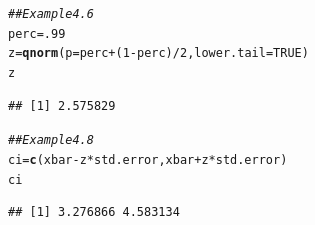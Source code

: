 \documentclass{report}\usepackage[]{graphicx}\usepackage[]{color}
\makeatletter
\newcommand{\hlnum}[1]{\textcolor[rgb]{0.686,0.059,0.569}{#1}}%
\newcommand{\hlcom}[1]{\textcolor[rgb]{0.678,0.584,0.686}{\textit{#1}}}%
\newcommand{\hlopt}[1]{\textcolor[rgb]{0,0,0}{#1}}%
\newcommand{\hlstd}[1]{\textcolor[rgb]{0.345,0.345,0.345}{#1}}%
\newcommand{\hlkwb}[1]{\textcolor[rgb]{0.69,0.353,0.396}{#1}}%
\newcommand{\hlkwc}[1]{\textcolor[rgb]{0.333,0.667,0.333}{#1}}%
\newcommand{\hlkwd}[1]{\textcolor[rgb]{0.737,0.353,0.396}{\textbf{#1}}}%
\newenvironment{kframe}{%
 \def\at@end@of@kframe{}%
 \ifinner\ifhmode%
  \def\at@end@of@kframe{\end{minipage}}%
  \begin{minipage}{\columnwidth}%
 \fi\fi%
 \def\FrameCommand##1{\hskip\@totalleftmargin \hskip-\fboxsep
 \colorbox{shadecolor}{##1}\hskip-\fboxsep
     \hskip-\linewidth \hskip-\@totalleftmargin \hskip\columnwidth}%
 \MakeFramed {\advance\hsize-\width
   \@totalleftmargin\z@ \linewidth\hsize
   \@setminipage}}%
 {\par\unskip\endMakeFramed%
 \at@end@of@kframe}
\newenvironment{knitrout}{}{} %
\makeatother
\begin{document}
\begin{knitrout}
\color{fgcolor}\begin{kframe}
\begin{alltt}
\hlcom{## Example 4.6 }
\hlstd{perc} \hlkwb{=} \hlnum{.99}
\hlstd{z} \hlkwb{=} \hlkwd{qnorm}\hlstd{(}\hlkwc{p} \hlstd{= perc} \hlopt{+} \hlstd{(}\hlnum{1}\hlopt{-}\hlstd{perc)}\hlopt{/}\hlnum{2}\hlstd{,} \hlkwc{lower.tail} \hlstd{=} \hlnum{TRUE}\hlstd{)}
\hlstd{z}
\end{alltt}
\begin{verbatim}
## [1] 2.575829
\end{verbatim}
\end{kframe}
\end{knitrout}

\begin{knitrout}
\color{fgcolor}\begin{kframe}
\begin{alltt}
\hlcom{## Example 4.8 }
\hlstd{ci} \hlkwb{=} \hlkwd{c}\hlstd{(xbar} \hlopt{-} \hlstd{z}\hlopt{*}\hlstd{std.error, xbar} \hlopt{+} \hlstd{z}\hlopt{*}\hlstd{std.error)}
\hlstd{ci}
\end{alltt}
\begin{verbatim}
## [1] 3.276866 4.583134
\end{verbatim}
\end{kframe}
\end{knitrout}
\end{document}
